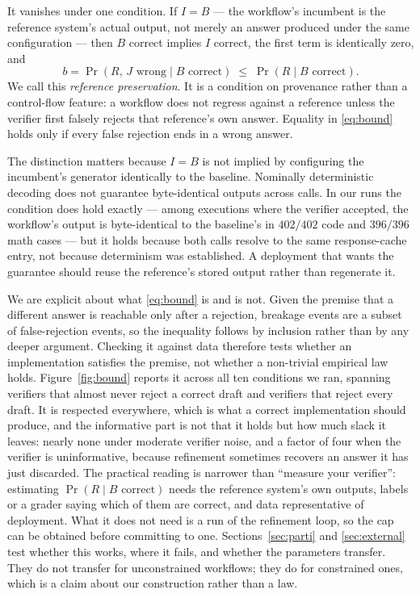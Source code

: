 \documentclass{article}
\newcommand{\brate}{b}
\begin{document}
It vanishes under one condition. If $I = B$ --- the workflow's incumbent is the
reference system's actual output, not merely an answer produced under the same
configuration --- then $B$ correct implies $I$ correct, the first term is
identically zero, and
\begin{equation}
\brate = \Pr(R,\, J\text{ wrong} \mid B\text{ correct})
       \;\le\; \Pr(R \mid B\text{ correct}).
\label{eq:bound}
\end{equation}
We call this \emph{reference preservation}. It is a condition on provenance
rather than a control-flow feature: a workflow does not regress against a
reference unless the verifier first falsely rejects that reference's own
answer. Equality in \eqref{eq:bound} holds only if every false rejection ends
in a wrong answer.

The distinction matters because $I=B$ is not implied by configuring the
incumbent's generator identically to the baseline. Nominally deterministic
decoding does not guarantee byte-identical outputs across calls. In our runs
the condition does hold exactly --- among executions where the verifier
accepted, the workflow's output is byte-identical to the baseline's in
$402/402$ code and $396/396$ math cases --- but it holds because both calls
resolve to the same response-cache entry, not because determinism was
established. A deployment that wants the guarantee should reuse the reference's
stored output rather than regenerate it.

We are explicit about what
\eqref{eq:bound} is and is not. Given the premise that a different answer is
reachable only after a rejection, breakage events are a subset of
false-rejection events, so the inequality follows by inclusion rather than by
any deeper argument. Checking it against data therefore tests whether an
implementation satisfies the premise, not whether a non-trivial empirical law
holds. Figure~\ref{fig:bound} reports it across all
ten conditions we ran, spanning verifiers that almost never reject a correct
draft and verifiers that reject every draft. It is respected everywhere, which
is what a correct implementation should produce, and the informative part is not
that it holds but how much slack it leaves: nearly none under moderate verifier
noise, and a factor of four when the verifier is uninformative, because
refinement sometimes recovers an answer it has just discarded. The practical reading is narrower than
``measure your verifier'': estimating $\Pr(R \mid B\text{ correct})$ needs the
reference system's own outputs, labels or a grader saying which of them are
correct, and data representative of deployment. What it does not need is a run
of the refinement loop, so the cap can be obtained before committing to one. Sections~\ref{sec:parti} and
\ref{sec:external} test whether this works, where it fails, and whether the
parameters transfer. They do not transfer for unconstrained workflows; they do
for constrained ones, which is a claim about our construction rather than a law.
\end{document}

